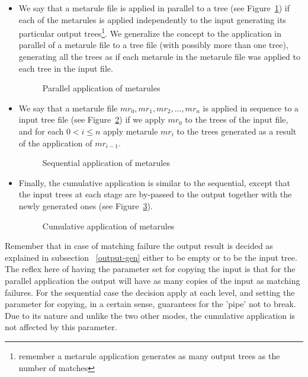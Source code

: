 \begin{itemize}
\item We say that a metarule file is applied in parallel to a tree 
(see Figure~\ref{parallel})
if each of the 
metarules is applied independently to the input generating its particular 
output trees\footnote{remember a metarule application generates as many 
output trees as the number of matches}. We generalize the concept to the
application in parallel of a metarule file to a tree file (with possibly more 
than one tree), generating all the trees
as if each metarule in the metarule file was applied to each tree in the
input file.

\begin{figure}[htb]
\centerline{}
\caption{Parallel application of metarules}
\label{parallel}
\end{figure}

\item We say that a metarule file $mr_0, mr_1, mr_2, ...,mr_n$ is applied in 
sequence to a input tree file 
(see Figure~\ref{sequential})
if we apply $mr_0$ to the trees of the input file, and
for each $0<i\leq n$ apply metarule $mr_i$ to the trees generated as a 
result of the application of $mr_{i-1}$.

\begin{figure}[htb]
\centerline{}
\caption{Sequential application of metarules}
\label{sequential}
\end{figure}

\item Finally, the cumulative application is similar to the sequential, 
except that the input trees at each stage are by-passed to the output together
with the newly generated ones (see Figure~\ref{cumulative}).

\begin{figure}[htb]
\centerline{}
\caption{Cumulative application of metarules}
\label{cumulative}
\end{figure}

\end{itemize}

Remember that in case of matching failure the output result is decided as 
explained in subsection ~\ref{output-gen} either to be empty or to be the 
input tree. The reflex here of having the parameter set for copying the input
is that for the parallel application the output will have as many copies of
the input as matching failures. For the sequential case the decision apply
at each level, and setting the parameter for copying, in a certain sense, 
guarantees for the 'pipe' not to break.
Due to its nature and unlike the two other modes, the cumulative 
application is not affected by this parameter.

